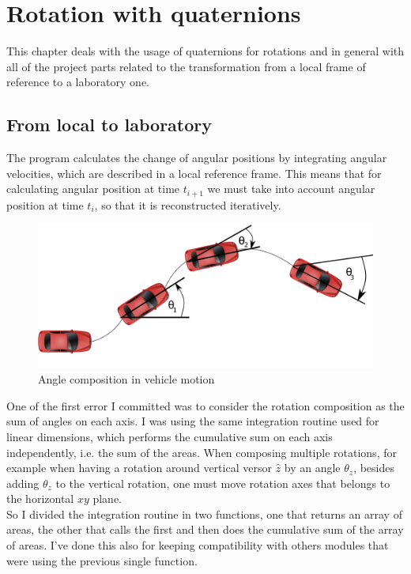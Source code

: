 \chapter{Rotation with quaternions}
\label{chap:rotation_with_quaternions}

This chapter deals with the usage of quaternions for rotations and in general with all of the project parts related to the transformation from a local frame of reference to a laboratory one.

\section{From local to laboratory}
The program calculates the change of angular positions by integrating angular velocities, which are described in a local reference frame. This means that for calculating angular position at time $t_{i+1}$ we must take into account angular position at time $t_i$, so that it is reconstructed iteratively.\\
\begin{figure}[H]
\includegraphics[width=\textwidth]{angle_composition.png}
\caption{Angle composition in vehicle motion}
\end{figure}
\justify
One of the first error I committed was to consider the rotation composition as the sum of angles on each axis. I was using the same integration routine used for linear dimensions, which performs the cumulative sum on each axis independently,  i.e. the sum of the areas. When composing multiple rotations, for example when having a rotation around vertical versor $\hat{z}$ by an angle $\theta_z$, besides adding $\theta_z$ to the vertical rotation, one must move rotation axes that belongs to the horizontal $xy$ plane. \\
So I divided the integration routine in two functions, one that returns an array of areas, the other that calls the first and then does the cumulative sum of the array of areas. I've done this also for keeping compatibility with others modules that were using the previous single function. \\
